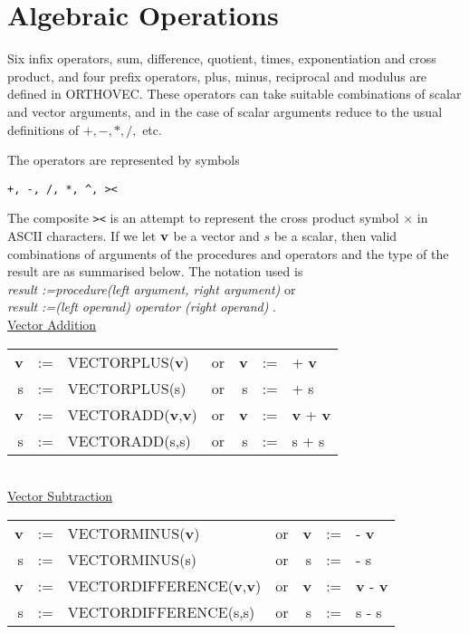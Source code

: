 \section{Algebraic Operations}

Six infix operators, sum, difference, quotient, times, exponentiation
and cross product, and four prefix
operators, plus, minus, reciprocal
and  modulus are defined in ORTHOVEC.  These operators can take suitable
combinations of scalar and vector arguments,
and in the case of scalar arguments reduce to the usual definitions of
$ +, -, *, /, $ etc.

The operators are represented by symbols 
  
  
\begin{verbatim}  
+, -, /, *, ^, ><
\end{verbatim}

 The composite {\tt ><} is an
attempt to represent the cross product symbol 
$\times$ in ASCII characters.
If we let ${\bf v}$ be a vector and $s$ be a scalar, then
valid combinations of arguments of the 
procedures and operators and the type of the result 
are as summarised below.  The notation used is\\
{\em result :=procedure(left argument, right argument) } or\\
{\em result :=(left operand) operator (right operand) } . \\

\newpage
\underline{Vector Addition} \\
  
\begin{tabular}{rclcrcl}
{\bf v} &:=& VECTORPLUS({\bf v})  &{\rm or}& {\bf v} &:=&  +  {\bf v} \\
     s  &:=& VECTORPLUS(s)  &{\rm or} &      s  &:=&  +       s  \\
{\bf v} &:=& VECTORADD({\bf v},{\bf v})  &{\rm or }& {\bf v} &:=&  
{\bf v} +  {\bf v} \\
     s  &:=& VECTORADD(s,s)  &{\rm or }&      s  &:=&  s + s \\
\end{tabular} \\

\underline{Vector Subtraction} \\
  
\begin{tabular}{rclcrcl}
{\bf v} &:=& VECTORMINUS({\bf v})  &{\rm or}&
 {\bf v} &:=&  -  {\bf v} \\
 s  &:=& VECTORMINUS(s)  &{\rm or} &      s  &:=&  -       s  \\
{\bf v} &:=& VECTORDIFFERENCE({\bf v},{\bf v})  &{\rm or }& {\bf v} &:=&
  {\bf v} -  {\bf v} \\
 s  &:=& VECTORDIFFERENCE(s,s)  &{\rm or }&      s  &:=&  s - s \\
\end{tabular} \\

